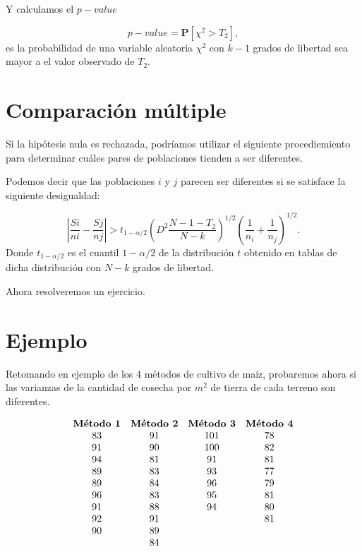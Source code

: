 \documentclass[
  a4paper,
  oneside,
  openany]{book}
\begin{document}
Y calculamos el \(p-value\)

\[p-value= \mathbf{P}\left[\chi^2>T_{2}\right],\]
es la probabilidad de una variable aleatoria \(\chi^2\) con \(k-1\) grados de libertad sea mayor a el valor observado de \(T_2\).

\hypertarget{comparaciuxf3n-muxfaltiple}{%
\section{Comparación múltiple}\label{comparaciuxf3n-muxfaltiple}}

Si la hipótesis nula es rechazada, podríamos utilizar el siguiente procediemiento para determinar cuáles pares de poblaciones tienden a ser diferentes.

Podemos decir que las poblaciones \(i\) y \(j\) parecen ser diferentes si se satisface la siguiente desigualdad:

\[\left|\frac{Si}{ni}- \frac{Sj}{nj}\right|> t_{1-\alpha/2}\left(D^2\frac{N-1-T_{2}}{N-k}\right)^{1/2}\left(\frac{1}{n_i}+\frac{1}{n_j}\right)^{1/2}.\]
Donde \(t_{1-\alpha/2}\) es el cuantil \(1-\alpha/2\) de la distribución \(t\) obtenido en tablas de dicha distribución con \(N-k\) grados de libertad.

Ahora resolveremos un ejercicio.

\hypertarget{ejemplo-9}{%
\section{Ejemplo}\label{ejemplo-9}}

Retomando en ejemplo de los 4 métodos de cultivo de maíz, probaremos ahora si las varianzas de la cantidad de cosecha por \(m^2\) de tierra de cada terreno son diferentes.

\[
\begin{array}{c c c c} 
\textbf{Método 1} & \textbf{Método 2} & \textbf{Método 3} & \textbf{Método 4}\\
83&91&101&78\\
91&90&100&82\\
94&81&91&81\\
89&83&93&77\\
89&84&96&79\\
96&83&95&81\\
91&88&94&80\\
92&91&  &81\\
90&89&  &\\
  &84&  &\\
\end{array}
\]
\end{document}
